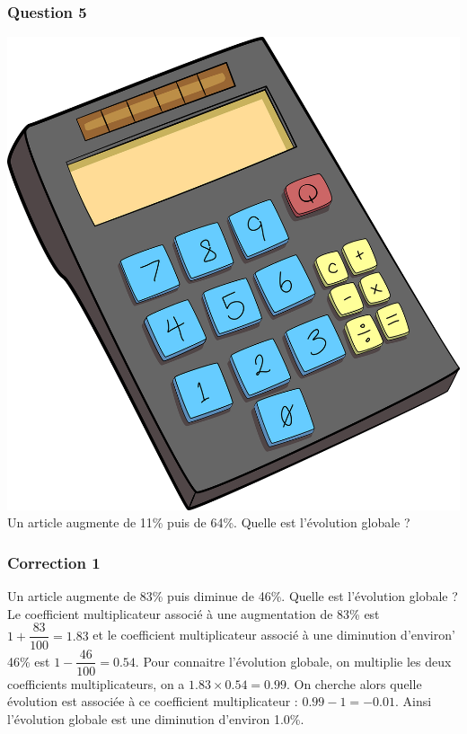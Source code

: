 \documentclass[15pt, mathserif]{beamer}
\begin{document}
\begin{frame} 
	\frametitle{Question 5}
\includegraphics[scale=0.01]{calculatrice} Un article augmente de 11\% puis de 64\%. Quelle est l'évolution globale ?\end{frame}


\begin{frame}
\vspace{-10mm}
	\frametitle{Correction 1}
\vspace*{1cm} Un article augmente de 83\% puis diminue de 46\%. Quelle est l'évolution globale ? \\ Le coefficient multiplicateur associé à une augmentation de 83\% est $1+\dfrac{83}{100} = 1.83$ et le coefficient multiplicateur associé à une diminution d'environ' 46\% est $1-\dfrac{46}{100} = 0.54$. Pour connaitre l'évolution globale, on multiplie les deux coefficients multiplicateurs, on a $ 1.83 \times 0.54=0.99$. On cherche alors quelle évolution est associée à ce coefficient multiplicateur : $0.99-1 =-0.01$. Ainsi l'évolution globale est une diminution d'environ 1.0\%. 
 \begin{center} 
 \end{center}\end{frame}
\end{document}
